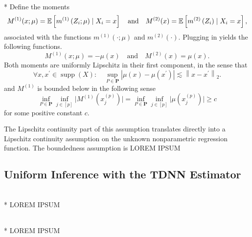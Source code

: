 \begin{boxD}
	\begin{asm}\mbox{}\\*
		Define the moments
		\begin{equation}
			M^{(1)}(x ; \mu)
			= \mathbb{E}\left[m^{(1)}\left(Z_{i} ; \mu\right) \mid X_{i}= x\right]
			\quad \text{and} \quad
			M^{(2)}(x)
			= \mathbb{E}\left[m^{(2)}\left(Z_{i}\right) \mid X_{i} = x\right],
		\end{equation}
		associated with the functions $m^{(1)}(\cdot ; \mu)$ and $m^{(2)}(\cdot)$.
		Plugging in yields the following functions.
		\begin{equation}
			M^{(1)}(x ; \mu)
			= -\mu(x)
			\quad \text{and} \quad
			M^{(2)}(x)
			= \mu(x).
		\end{equation}
		Both moments are uniformly Lipschitz in their first component, in the sense that
		\begin{equation}
			\forall x, x^{\prime} \in \operatorname{supp}\left(X\right): \quad
			\sup _{P \in \mathbf{P}}
			\left|\mu(x)-\mu\left(x^{\prime}\right)\right|
			\lesssim\left\|x-x^{\prime}\right\|_{2}.
		\end{equation}
		and $M^{(1)}$ is bounded below in the following sense
		\begin{equation}
			\inf_{P \in \mathbf{P}} \inf_{j \in [p]} \Big|M^{(1)}\left(x^{(p)}_{j}\right) \Big|
			= \inf_{P \in \mathbf{P}} \inf_{j \in [p]} \Big|\mu\left(x^{(p)}_{j}\right) \Big| \geq c
		\end{equation}
		for some positive constant $c$.
	\end{asm}
\end{boxD}


The Lipschitz continuity part of this assumption translates directly into a Lipschitz continuity assumption on the unknown nonparametric regression function.
The boundedness assumption is
	{\color{red} LOREM IPSUM}

\subsection{Uniform Inference with the TDNN Estimator}
\begin{boxD}
	\begin{thm}\label{thm:unif_inf_TDNN}\mbox{}\\*
		{\color{red} LOREM IPSUM}
	\end{thm}
\end{boxD}

\begin{boxD}
	\begin{thm}\label{thm:unif_inf_TDNN_HTE}\mbox{}\\*
		{\color{red} LOREM IPSUM}
	\end{thm}
\end{boxD}
